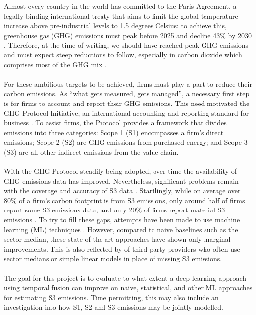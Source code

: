 \documentclass[12pt,twoside]{report}
\begin{document}
Almost every country in the world has committed to the Paris Agreement, a legally binding international treaty that aims to limit the global temperature increase above pre-industrial levels to 1.5 degrees Celsius: to achieve this, greenhouse gas (GHG) emissions must peak before 2025 and decline 43\% by 2030 \cite{unfcc2024}. Therefore, at the time of writing, we should have reached peak GHG emissions and must expect steep reductions to follow, especially in carbon dioxide which comprises most of the GHG mix \cite{Ritchie2023}. 
\\\\
For these ambitious targets to be achieved, firms must play a part to reduce their carbon emissions. As ``what gets measured, gets managed'', a necessary first step is for firms to account and report their GHG emissions. This need motivated the GHG Protocol Initiative, an international accounting and reporting standard for business \cite{ghgprotocol2004}. To assist firms, the Protocol provides a framework that divides emissions into three categories: Scope 1 (S1) encompasses a firm's direct emissions; Scope 2 (S2) are GHG emissions from purchased energy; and Scope 3 (S3) are all other indirect emissions from the value chain. 
\\\\
With the GHG Protocol steadily being adopted, over time the availability of GHG emissions data has improved. Nevertheless, significant problems remain with the coverage and accuracy of S3 data \cite{Papadopoulos2022}. Startlingly, while on average over 80\% of a firm's carbon footprint is from S3 emissions, only around half of firms report some S3 emissions data, and only 20\% of firms report material S3 emissions \cite{ftserussell2024}. To try to fill these gaps, attempts have been made to use machine learning (ML) techniques \cite{nguyen2021, Nguyenetal2023}. However, compared to naive baselines such as the sector median, these state-of-the-art approaches have shown only marginal improvements. This is also reflected by of third-party providers who often use sector medians or simple linear models in place of missing S3 emissions. 
\\\\
The goal for this project is to evaluate to what extent a deep learning approach using temporal fusion can improve on naive, statistical, and other ML approaches for estimating S3 emissions. Time permitting, this may also include an investigation into how S1, S2 and S3 emissions may be jointly modelled.
\end{document}
